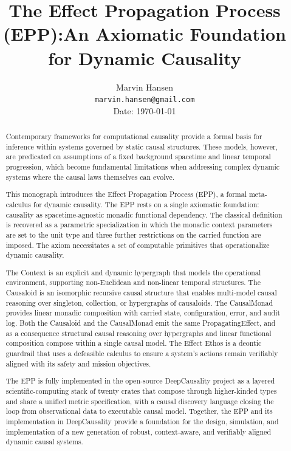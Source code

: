 \documentclass{article}
\title{The Effect Propagation Process (EPP):\newline An Axiomatic Foundation for Dynamic Causality}
\author{
  Marvin Hansen \\
  \texttt{marvin.hansen@gmail.com} \\
   Date: \today
}
\begin{document}
\maketitle

\begin{abstract}
Contemporary frameworks for computational causality provide a formal basis for inference within systems governed by static causal structures. These models, however, are predicated on assumptions of a fixed background spacetime and linear temporal progression, which become fundamental limitations when addressing complex dynamic systems where the causal laws themselves can evolve.

This monograph introduces the Effect Propagation Process (EPP), a formal meta-calculus for dynamic causality. The EPP rests on a single axiomatic foundation: causality as spacetime-agnostic monadic functional dependency. The classical definition is recovered as a parametric specialization in which the monadic context parameters are set to the unit type and three further restrictions on the carried function are imposed. The axiom necessitates a set of computable primitives that operationalize dynamic causality. 

The Context is an explicit and dynamic hypergraph that models the operational environment, supporting non-Euclidean and non-linear temporal structures. The Causaloid is an isomorphic recursive causal structure that enables multi-model causal reasoning over singleton, collection, or hypergraphs of causaloids. 
The CausalMonad provides linear monadic composition with carried state, configuration, error, and audit log. Both the Causaloid and the CausalMonad emit the same PropagatingEffect, and as a consequence structural causal reasoning over hypergraphs and linear functional composition compose within a single causal model. The Effect Ethos is a deontic guardrail that uses a defeasible calculus to ensure a system's actions remain verifiably aligned with its safety and mission objectives.
 
The EPP is fully implemented in the open-source DeepCausality project as a layered scientific-computing stack of twenty crates that compose through higher-kinded types and share a unified metric specification, with a causal discovery language closing the loop from observational data to executable causal model. Together, the EPP and its implementation in DeepCausality provide a foundation for the design, simulation, and implementation of a new generation of robust, context-aware, and verifiably aligned dynamic causal systems.
\end{abstract}
 
\end{document}
